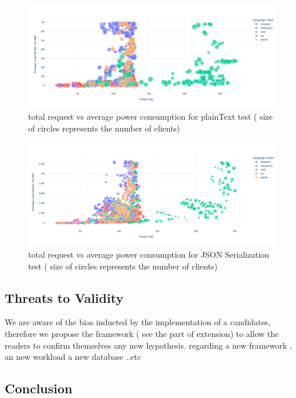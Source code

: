 \begin{figure}[hbt]
    \centering
    \includegraphics[width=
        \columnwidth]{imgs/power_requests_plaintext}
    \caption{total request vs average power consumption for plainText test ( size of circles represents the number of clients)}
    \label{fig:power_requests_plaintext}
\end{figure}

\begin{figure}[hbt]
    \centering
    \includegraphics[width=
        \columnwidth]{imgs/power_requests_json}
    \caption{total request vs average power consumption for JSON Serialization test ( size of circles represents the number of clients)}
    \label{fig:power_requests_json}
\end{figure}
\subsection{Threats to Validity}
We are aware of the bias inducted by the implementation of a candidates, therefore we propose  the framework ( see the part of extension) to allow the readers to confirm themselves any new hypothesis. regarding a new framework , an new workload a new database ..etc

\subsection{Conclusion}

